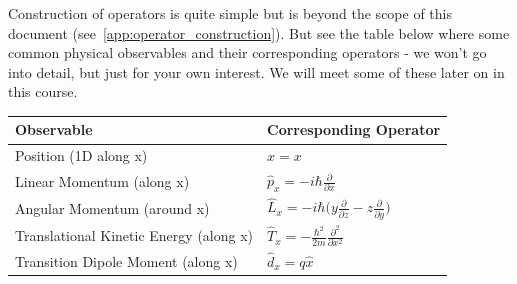 \documentclass{memoir}[11pt,oneside,a4paper,openany]
\begin{document}
Construction of operators is quite simple but is beyond the scope of this document (see~\autoref{app:operator_construction}). But see the table below where some common physical observables and their corresponding operators - we won't go into detail, but just for your own interest. We will meet some of these later on in this course. 
\begin{table}[h!]
	\centering
\begin{tabular}{@{}ll@{}}
\toprule
Observable & Corresponding Operator \\ \midrule
Position (1D along x) & $\hat{x} = x$ \\
Linear Momentum (along x) & $\hat{p}_x = -i\hbar \frac{\partial}{\partial x}$ \\
Angular Momentum (around x) & $\hat{L}_x = -i\hbar \big( y\frac{\partial}{\partial z} - z \frac{\partial}{\partial y} \big)$  \\
Translational Kinetic Energy (along x)	& $\hat{T}_x = -\frac{\hbar^2}{2m} \frac{\partial^2}{\partial x^2}$ \\
Transition Dipole Moment (along x) &  $\hat{d}_x = q\hat{x}$ \\ \bottomrule
\end{tabular}
\end{table}
\end{document}
